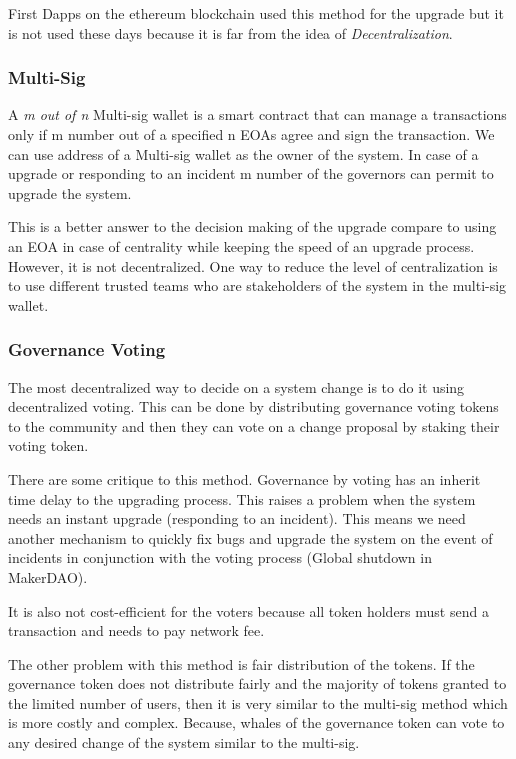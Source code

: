 First Dapps on the ethereum blockchain used this method for the upgrade but it is not used these days because it is far from the idea of \textit{Decentralization}. 

 \subsubsection{Multi-Sig}
 A \textit{m out of n} Multi-sig wallet is a smart contract that can manage a transactions only if m number out of a specified n EOAs agree and sign the transaction. We can use address of a Multi-sig wallet as the owner of the system. In case of a upgrade or responding to an incident m number of the governors can permit to upgrade the system.

 This is a better answer to the decision making of the upgrade compare to using an EOA in case of centrality while keeping the speed of an upgrade process. However, it is not decentralized. One way to reduce the level of centralization is to use different trusted teams who are stakeholders of the system in the multi-sig wallet. 


\subsubsection{Governance Voting}
The most decentralized way to decide on a system change is to do it using decentralized voting. This can be done by distributing governance voting tokens to the community and then they can vote on a change proposal by staking their voting token. 

There are some critique to this method. Governance by voting has an inherit time delay to the upgrading process. This raises a problem when the system needs an instant upgrade (\eg responding to an incident). This means we need another mechanism to quickly fix bugs and upgrade the system on the event of incidents in conjunction with the voting process (\eg Global shutdown in MakerDAO).

It is also not cost-efficient for the voters because all token holders must send a transaction and needs to pay network fee.

The other problem with this method is fair distribution of the tokens. If the governance token does not distribute fairly and the majority of tokens granted to the limited number of users, then it is very similar to the multi-sig method which is more costly and complex. Because, whales of the governance token can vote to any desired change of the system similar to the multi-sig.
 

